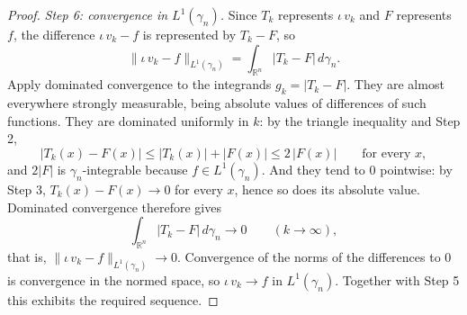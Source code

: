 \begin{proof}
\emph{Step 6: convergence in $L^1(\gamma_n)$.}
Since $T_k$ represents $\iota\, v_k$ and $F$ represents $f$, the difference
$\iota\, v_k - f$ is represented by $T_k - F$, so
\[
  \|\iota\, v_k - f\|_{L^1(\gamma_n)}
    = \int_{\mathbb{R}^n} |T_k - F| \, d\gamma_n .
\]
Apply dominated convergence to the integrands $g_k = |T_k - F|$.  They are
almost everywhere strongly measurable, being absolute values of differences of
such functions.  They are dominated uniformly in $k$: by the triangle inequality
and Step 2,
\[
  |T_k(x) - F(x)| \leq |T_k(x)| + |F(x)| \leq 2\,|F(x)|
  \qquad\text{for every } x ,
\]
and $2|F|$ is $\gamma_n$-integrable because $f \in L^1(\gamma_n)$.  And they tend
to $0$ pointwise: by Step 3, $T_k(x) - F(x) \to 0$ for every $x$, hence so does
its absolute value.  Dominated convergence therefore gives
\[
  \int_{\mathbb{R}^n} |T_k - F| \, d\gamma_n \longrightarrow 0
  \qquad (k \to \infty),
\]
that is, $\|\iota\, v_k - f\|_{L^1(\gamma_n)} \to 0$.  Convergence of the norms of
the differences to $0$ is convergence in the normed space, so
$\iota\, v_k \to f$ in $L^1(\gamma_n)$.  Together with Step 5 this exhibits the
required sequence.
\end{proof}
